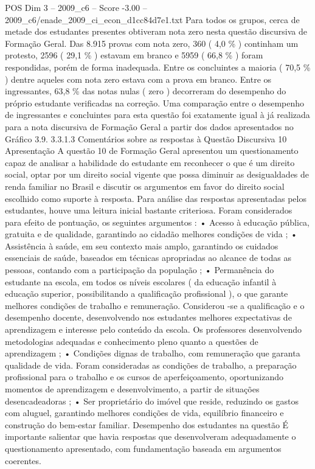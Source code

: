 \begin{textsample}{POS Dim 3 – 2009\_c6 – Score -3.00 – 2009\_c6/enade\_2009\_ci\_econ\_d1cc84d7e1.txt}
Para todos os grupos, cerca de metade dos estudantes presentes obtiveram nota zero nesta questão discursiva de Formação Geral.
Das 8.915 provas com nota zero, 360 ( 4,0 \% ) continham um protesto, 2596 ( 29,1 \% ) estavam em branco e 5959 ( 66,8 \% ) foram respondidas, porém de forma inadequada.
Entre os concluintes a maioria ( 70,5 \% ) dentre aqueles com nota zero estava com a prova em branco.
Entre os ingressantes, 63,8 \% das notas nulas ( zero ) decorreram do desempenho do próprio estudante verificadas na correção.
Uma comparação entre o desempenho de ingressantes e concluintes para esta questão foi exatamente igual à já realizada para a nota discursiva de Formação Geral a partir dos dados apresentados no Gráfico 3.9. 3.3.1.3 Comentários sobre as respostas à Questão Discursiva 10 Apresentação A questão 10 de Formação Geral apresentou um questionamento capaz de analisar a habilidade do estudante em reconhecer o que é um direito social, optar por um direito social vigente que possa diminuir as desigualdades de renda familiar no Brasil e discutir os argumentos em favor do direito social escolhido como suporte à resposta.
Para análise das respostas apresentadas pelos estudantes, houve uma leitura inicial bastante criteriosa.
Foram considerados para efeito de pontuação, os seguintes argumentos : • Acesso à educação pública, gratuita e de qualidade, garantindo ao cidadão melhores condições de vida ; • Assistência à saúde, em seu contexto mais amplo, garantindo os cuidados essenciais de saúde, baseados em técnicas apropriadas ao alcance de todas as pessoas, contando com a participação da população ; • Permanência do estudante na escola, em todos os níveis escolares ( da educação infantil à educação superior, possibilitando a qualificação profissional ), o que garante melhores condições de trabalho e remuneração.
Considerou -se a qualificação e o desempenho docente, desenvolvendo nos estudantes melhores expectativas de aprendizagem e interesse pelo conteúdo da escola.
Os professores desenvolvendo metodologias adequadas e conhecimento pleno quanto a questões de aprendizagem ; • Condições dignas de trabalho, com remuneração que garanta qualidade de vida.
Foram consideradas as condições de trabalho, a preparação profissional para o trabalho e os cursos de aperfeiçoamento, oportunizando momentos de aprendizagem e desenvolvimento, a partir de situações desencadeadoras ; • Ser proprietário do imóvel que reside, reduzindo os gastos com aluguel, garantindo melhores condições de vida, equilíbrio financeiro e construção do bem-estar familiar.
Desempenho dos estudantes na questão É importante salientar que havia respostas que desenvolveram adequadamente o questionamento apresentado, com fundamentação baseada em argumentos coerentes.

\end{textsample}
